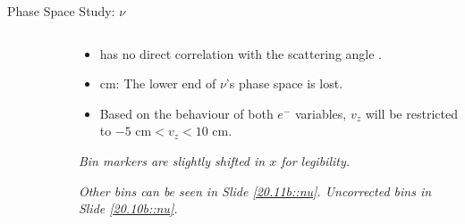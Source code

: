 \begin{frame}{Phase Space Study: $\nu$}
    \label{12.13::nu}

    \begin{columns}[onlytextwidth,T]

    \begin{column}{.48\linewidth}
        \vspace{-15pt}
        \begin{center}
            \begin{figure}[t]
            \end{figure}
        \end{center}
    \end{column}

    \begin{column}{.50\linewidth}
        \begin{itemize}
            \item
                \ef{$\nu$} has no direct correlation with the scattering angle .

            \vspace{12pt}
            \item
                 \textcolor{efd_green}{cm}: The lower end of $\nu$'s phase space is lost.

            \vspace{12pt}
            \item
                Based on the behaviour of both $e^-$ variables, $v_z$ will be restricted to \textcolor{efd_green}{$-5 \text{ cm} < v_z < 10 \text{ cm}$}.
        \end{itemize}

        \vspace{69pt}

        \begin{flushright}
            \tiny{\textit{Bin markers are slightly shifted in $x$ for legibility.}}

            \tiny{\textit{
                Other bins can be seen in Slide \textcolor{efd_purple}{\ref{20.11b::nu}}.
                Uncorrected bins in Slide \textcolor{efd_purple}{\ref{20.10b::nu}}.
            }}
        \end{flushright}
    \end{column}

    \end{columns}
\end{frame}

